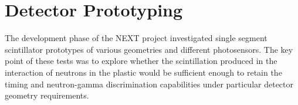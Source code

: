 %
%
%
%
%
%
%
%
%
%
%
%
%
%
%
%
%
%
%
%
%


\section{Detector Prototyping}
The development phase of the NEXT project investigated single segment scintillator prototypes of various geometries and different photosensors. The key point of these tests was to explore whether the scintillation produced in the interaction of neutrons in the plastic would be sufficient enough to retain the timing and neutron-gamma discrimination capabilities under particular detector geometry requirements.

